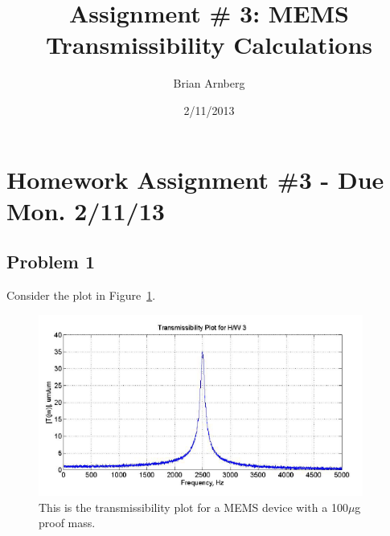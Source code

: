 \documentclass{article}
\title{Assignment \# 3: MEMS Transmissibility Calculations}
\date{2/11/2013}
\author{Brian Arnberg}
\begin{document}
\label{start}



\section*{ Homework Assignment \#3 - Due Mon. 2/11/13 }
\subsection*{ Problem 1 }
Consider the plot in Figure~\ref{fig:plot1}.
\begin{figure}[h]
   \centering
   \includegraphics[width=0.95\textwidth,keepaspectratio]{plot1}
   \caption{ This is the transmissibility plot for a MEMS device with a 100$\mu$g proof mass.} 
   \label{fig:plot1}
\end{figure}
\renewcommand{\labelenumi}{\alph{enumi}.}
\end{document}
